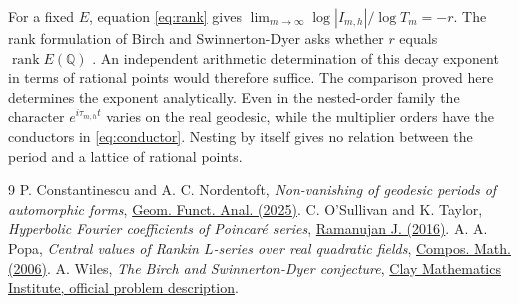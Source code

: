 \documentclass[11pt]{article}
\newcommand{\Q}{\mathbb Q}
\begin{document}
For a fixed \(E\), equation \eqref{eq:rank} gives
\(\lim_{m\to\infty}\log |I_{m,h}|/\log T_m=-r\).
The rank formulation of Birch and Swinnerton-Dyer asks whether \(r\)
equals \(\operatorname{rank}E(\Q)\) \cite{wiles}. An independent
arithmetic determination of this decay exponent in terms of rational
points would therefore suffice. The comparison proved here determines
the exponent analytically. Even in the nested-order family the
character \(e^{i\tau_{m,h}t}\) varies on the real geodesic, while the
multiplier orders have the conductors in \eqref{eq:conductor}.
Nesting by itself gives no relation between the period and a lattice
of rational points.

\begin{thebibliography}{9}
 P. Constantinescu and A. C. Nordentoft,
\emph{Non-vanishing of geodesic periods of automorphic forms},
\href{https://doi.org/10.1007/s00039-025-00715-z}{Geom. Funct. Anal. (2025)}.
 C. O'Sullivan and K. Taylor,
\emph{Hyperbolic Fourier coefficients of Poincar\'e series},
\href{https://doi.org/10.1007/s11139-016-9772-6}{Ramanujan J. (2016)}.
 A. A. Popa,
\emph{Central values of Rankin \(L\)-series over real quadratic fields},
\href{https://doi.org/10.1112/S0010437X06002259}{Compos. Math. (2006)}.
 A. Wiles, \emph{The Birch and Swinnerton-Dyer conjecture},
\href{https://www.claymath.org/wp-content/uploads/2022/05/birchswin.pdf}
{Clay Mathematics Institute, official problem description}.
\end{thebibliography}
\end{document}
